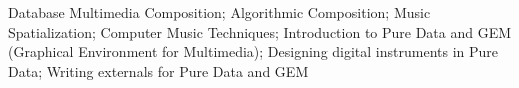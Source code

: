 Database Multimedia Composition; Algorithmic Composition; Music Spatialization; Computer Music Techniques; Introduction to Pure Data and GEM (Graphical Environment for Multimedia); Designing digital instruments in Pure Data; Writing externals for Pure Data and GEM